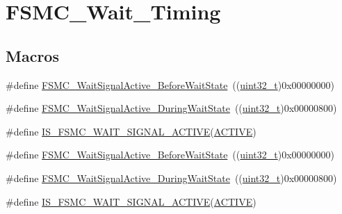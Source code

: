 \hypertarget{group___f_s_m_c___wait___timing}{}\section{F\+S\+M\+C\+\_\+\+Wait\+\_\+\+Timing}
\label{group___f_s_m_c___wait___timing}
\subsection*{Macros}
\begin{DoxyCompactItemize}
\item 
\#define \hyperlink{group___f_s_m_c___wait___timing_ga62c6855a7cc65b20024085f09cdc65e8}{F\+S\+M\+C\+\_\+\+Wait\+Signal\+Active\+\_\+\+Before\+Wait\+State}~((\hyperlink{_p_e___types_8h_a33594304e786b158f3fb30289278f5af}{uint32\+\_\+t})0x00000000)
\item 
\#define \hyperlink{group___f_s_m_c___wait___timing_gae905fc59e5d99091d132d7c221c8b6d4}{F\+S\+M\+C\+\_\+\+Wait\+Signal\+Active\+\_\+\+During\+Wait\+State}~((\hyperlink{_p_e___types_8h_a33594304e786b158f3fb30289278f5af}{uint32\+\_\+t})0x00000800)
\item 
\#define \hyperlink{group___f_s_m_c___wait___timing_ga3edb40c756afa8bb78550b7e22ded093}{I\+S\+\_\+\+F\+S\+M\+C\+\_\+\+W\+A\+I\+T\+\_\+\+S\+I\+G\+N\+A\+L\+\_\+\+A\+C\+T\+I\+VE}(\hyperlink{group___u_a_r_t___public___types_ggada493f726a4ea247b209b49fb8c85a52a33cf1d8ef1d06ee698a7fabf40eb3a7f}{A\+C\+T\+I\+VE})
\item 
\#define \hyperlink{group___f_s_m_c___wait___timing_ga62c6855a7cc65b20024085f09cdc65e8}{F\+S\+M\+C\+\_\+\+Wait\+Signal\+Active\+\_\+\+Before\+Wait\+State}~((\hyperlink{_p_e___types_8h_a33594304e786b158f3fb30289278f5af}{uint32\+\_\+t})0x00000000)
\item 
\#define \hyperlink{group___f_s_m_c___wait___timing_gae905fc59e5d99091d132d7c221c8b6d4}{F\+S\+M\+C\+\_\+\+Wait\+Signal\+Active\+\_\+\+During\+Wait\+State}~((\hyperlink{_p_e___types_8h_a33594304e786b158f3fb30289278f5af}{uint32\+\_\+t})0x00000800)
\item 
\#define \hyperlink{group___f_s_m_c___wait___timing_ga3edb40c756afa8bb78550b7e22ded093}{I\+S\+\_\+\+F\+S\+M\+C\+\_\+\+W\+A\+I\+T\+\_\+\+S\+I\+G\+N\+A\+L\+\_\+\+A\+C\+T\+I\+VE}(\hyperlink{group___u_a_r_t___public___types_ggada493f726a4ea247b209b49fb8c85a52a33cf1d8ef1d06ee698a7fabf40eb3a7f}{A\+C\+T\+I\+VE})
\end{DoxyCompactItemize}



